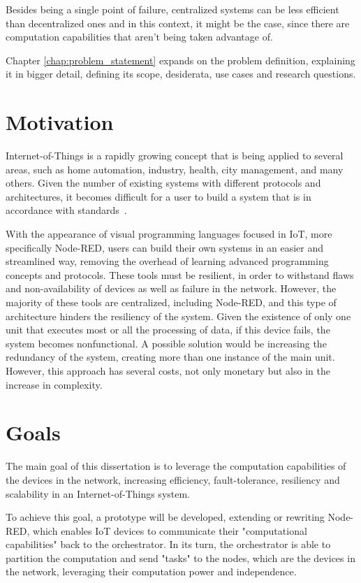 Besides being a single point of failure, centralized systems can be less efficient than decentralized ones and in this context, it might be the case, since there are computation capabilities that aren't being taken advantage of.

Chapter \ref{chap:problem_statement} expands on the problem definition, explaining it in bigger detail, defining its scope, desiderata, use cases and research questions.

\section{Motivation} \label{sec:motivation}

Internet-of-Things is a rapidly growing concept that is being applied to several areas, such as home automation, industry, health, city management, and many others. Given the number of existing systems with different protocols and architectures, it becomes difficult for a user to build a system that is in accordance with standards~\cite{standard-iot}. 

With the appearance of visual programming languages focused in IoT, more specifically Node-RED, users can build their own systems in an easier and streamlined way, removing the overhead of learning advanced programming concepts and protocols. These tools must be resilient, in order to withstand flaws and non-availability of devices as well as failure in the network. However, the majority of these tools are centralized, including Node-RED, and this type of architecture hinders the resiliency of the system. Given the existence of only one unit that executes most or all the processing of data, if this device fails, the system becomes nonfunctional. A possible solution would be increasing the redundancy of the system, creating more than one instance of the main unit. However, this approach has several costs, not only monetary but also in the increase in complexity.

\section{Goals} \label{sec:goals}

The main goal of this dissertation is to leverage the computation capabilities of the devices in the network, increasing efficiency, fault-tolerance, resiliency and scalability in an Internet-of-Things system.

To achieve this goal, a prototype will be developed, extending or rewriting Node-RED, which enables IoT devices to communicate their "computational capabilities" back to the orchestrator. In its turn, the orchestrator is able to partition the computation and send "tasks" to the nodes, which are the devices in the network, leveraging their computation power and independence.

